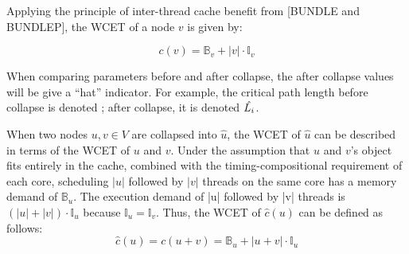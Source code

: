 Applying the principle of inter-thread cache benefit from \addcite{}
[BUNDLE and BUNDLEP], the WCET of a node ${v}$ is given by:

\begin{equation}
  c(v) = \mathbb{B}_v + |v| \cdot \mathbb{I}_v
\end{equation}

When comparing parameters before and after collapse, the after
collapse values will be give a ``hat'' indicator. For example, the
critical path length before collapse is denoted
; after collapse, it is denoted
${\hat{\criticalpathlen{i}}}$.

When two nodes ${u,v \in V}$ are collapsed into ${\hat{u}}$, the WCET
of ${\hat{u}}$ can be described in terms of the WCET of ${u}$ and
${v}$. Under the assumption that ${u}$ and ${v}$'s object fits
entirely in the cache, combined with the timing-compositional
requirement of each core, scheduling ${|u|}$ followed by ${|v|}$
threads on the same core has a memory demand of
${\mathbb{B}_u}$. The execution demand of |u| followed by |v| threads
is ${(|u| + |v|) \cdot \mathbb{I}_u}$ because ${\mathbb{I}_u =
  \mathbb{I}_v}$. Thus, the WCET of ${\hat{c}(u)}$ can be defined as 
follows:
\begin{equation*}
  \hat{c}(u) = c(u + v) = \mathbb{B}_u + |u + v| \cdot \mathbb{I}_u
  \label{eq:restriction}
\end{equation*}

